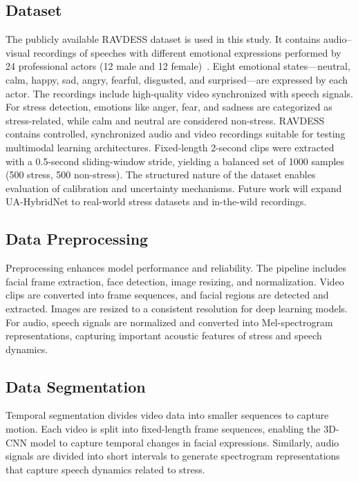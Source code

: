 \documentclass[conference]{IEEEtran}
\begin{document}
\subsection{Dataset}

The publicly available RAVDESS dataset is used in this study. It contains audio–visual recordings of speeches with different emotional expressions performed by 24 professional actors (12 male and 12 female)~\cite{ref5}. Eight emotional states—neutral, calm, happy, sad, angry, fearful, disgusted, and surprised—are expressed by each actor. The recordings include high-quality video synchronized with speech signals. For stress detection, emotions like anger, fear, and sadness are categorized as stress-related, while calm and neutral are considered non-stress. RAVDESS contains controlled, synchronized audio and video recordings suitable for testing multimodal learning architectures. Fixed-length 2-second clips were extracted with a 0.5-second sliding-window stride, yielding a balanced set of 1000 samples (500 stress, 500 non-stress). The structured nature of the dataset enables evaluation of calibration and uncertainty mechanisms. Future work will expand UA-HybridNet to real-world stress datasets and in-the-wild recordings.

\subsection{Data Preprocessing}

Preprocessing enhances model performance and reliability. The pipeline includes facial frame extraction, face detection, image resizing, and normalization. Video clips are converted into frame sequences, and facial regions are detected and extracted. Images are resized to a consistent resolution for deep learning models. For audio, speech signals are normalized and converted into Mel-spectrogram representations, capturing important acoustic features of stress and speech dynamics.

\subsection{Data Segmentation}

Temporal segmentation divides video data into smaller sequences to capture motion. Each video is split into fixed-length frame sequences, enabling the 3D-CNN model to capture temporal changes in facial expressions.
Similarly, audio signals are divided into short intervals to generate spectrogram representations that capture speech dynamics related to stress.
\end{document}

